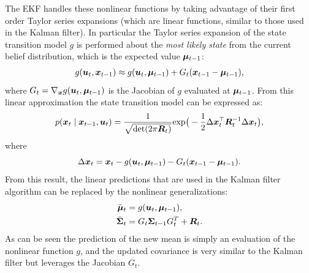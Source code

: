 The EKF handles these nonlinear functions by taking advantage of their first order Taylor series expansions (which are linear functions, similar to those used in the Kalman filter). In particular the Taylor series expansion of the state transition model $g$ is performed about the \textit{most likely state} from the current belief distribution, which is the expected value $\bm{\mu}_{t-1}$:
\begin{equation*}
\begin{split}
g(\bm{u}_t, \bm{x}_{t-1}) &\approx g(\bm{u}_t, \bm{\mu}_{t-1}) + G_t (\bm{x}_{t-1}-\bm{\mu}_{t-1}), \\
\end{split}
\end{equation*}
where $G_t = \nabla_{\bm{x}} g(\bm{u}_t, \bm{\mu}_{t-1})$ is the Jacobian of $g$ evaluated at $\bm{\mu}_{t-1}$. From this linear approximation the state transition model can be expressed as:
\begin{equation*}
p(\bm{x}_t \mid \bm{x}_{t-1}, \bm{u}_t) = \frac{1}{\sqrt{\text{det}(2\pi \bm{R}_t)}} \text{exp}\big( -\frac{1}{2}\Delta \bm{x}_t^\top  \bm{R}_t^{-1} \Delta \bm{x}_t \big),
\end{equation*}
where
\begin{equation*}
\Delta \bm{x}_t = \bm{x}_t-g(\bm{u}_t, \bm{\mu}_{t-1}) - G_t (\bm{x}_{t-1}-\bm{\mu}_{t-1}).
\end{equation*}
From this result, the linear predictions that are used in the Kalman filter algorithm can be replaced by the nonlinear generalizations:
\begin{equation*}
\begin{split}
\bar{\bm{\mu}}_t &= g(\bm{u}_t,\bm{\mu}_{t-1}), \\
\bar{\bm{\Sigma}}_t &= G_t\bm{\Sigma}_{t-1} G_t^{T} + \bm{R}_t.
\end{split}
\end{equation*}
As can be seen the prediction of the new mean is simply an evaluation of the nonlinear function $g$, and the updated covariance is very similar to the Kalman filter but leverages the Jacobian $G_t$.

